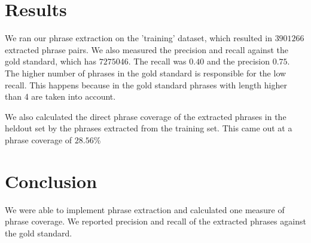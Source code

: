 \documentclass[11pt]{article}
\begin{document}
\section{Results}
We ran our phrase extraction on the 'training' dataset, which resulted in $3901266$ extracted phrase pairs. We also measured the precision and recall against the gold standard, which has $7275046$. The recall was $0.40$ and the precision $0.75$. The higher number of phrases in the gold standard is responsible for the low recall. This happens because in the gold standard phrases with length higher than 4 are taken into account.

We also calculated the direct phrase coverage of the extracted phrases in the heldout set by the phrases extracted from the training set. This came out at a phrase coverage of $28.56$\%

\section{Conclusion}
We were able to implement phrase extraction and calculated one measure of phrase coverage. We reported precision and recall of the extracted phrases against the gold standard.


\end{document}
